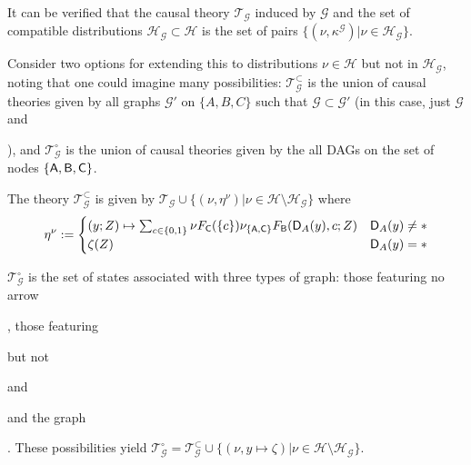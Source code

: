 \begin{example}
It can be verified that the causal theory $\mathscr{T}_{\mathcal{G}}$ induced by $\mathcal{G}$ and the set of compatible distributions $\mathscr{H}_\mathcal{G}\subset\mathscr{H}$ is the set of pairs $\{(\nu,\kappa^{\mathcal{G}} )|\nu\in \mathscr{H}_{\mathcal{G}}\}$.

Consider two options for extending this to distributions $\nu\in \mathscr{H}$ but not in $\mathscr{H}_{\mathcal{G}}$, noting that one could imagine many possibilities: $\mathscr{T}_{\mathcal{G}}^\subset$ is the union of causal theories given by all graphs $\mathcal{G}'$ on $\{A, B, C\}$ such that $\mathcal{G}\subset \mathcal{G}'$ (in this case, just $\mathcal{G}$ and ), and  $\mathscr{T}_{\mathcal{G}}^\circ$ is the union of causal theories given by the all DAGs on the set of nodes $\{\mathsf{A}, \mathsf{B}, \mathsf{C}\}$.

The theory $\mathscr{T}_{\mathcal{G}}^\subset$ is given by $\mathscr{T}_{\mathcal{G}}\cup\{(\nu,\eta^\nu )|\nu \in \mathscr{H}\setminus\mathscr{H}_\mathcal{G}\}$ where 
\begin{align}
    \eta^\nu:=\begin{cases}(y;Z)\mapsto \sum_{c\in\{0,1\}} \nu F_{\mathsf{C}}(\{c\}) \nu_{\{\mathsf{A},\mathsf{C}\}} F_{\mathsf{B}}(\mathsf{D}_A(y),c;Z) &\mathsf{D}_A(y)\neq *\\
    \zeta(Z) &\mathsf{D}_A(y)=*\end{cases}
\end{align}

$\mathscr{T}_{\mathcal{G}}^\circ$ is the set of states associated with three types of graph: those featuring no arrow , those featuring  but not  and  and the graph . These possibilities yield $\mathscr{T}_{\mathcal{G}}^\circ=\mathscr{T}_{\mathcal{G}}^\subset\cup\{(\nu,y\mapsto \zeta)|\nu \in \mathscr{H}\setminus\mathscr{H}_\mathcal{G}\}$.


\end{example}
